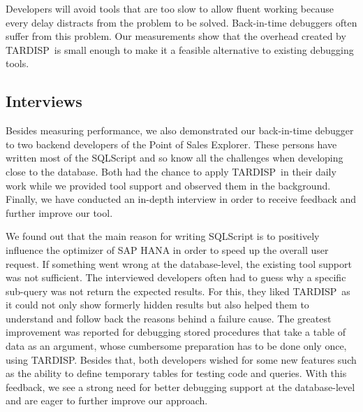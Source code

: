 \documentclass[english,conference,final]{IEEEtran}
\newcommand{\tool}{TAR\-DISP}
\begin{document}
Developers will avoid tools that are too slow to allow fluent working because every delay distracts from the problem to be solved. 
Back-in-time debuggers often suffer from this problem.
Our measurements show that the overhead created by \tool\ is small enough to make it a feasible alternative to existing debugging tools.

\subsection{Interviews}

Besides measuring performance, we also demonstrated our back-in-time debugger to two backend developers of the Point of Sales Explorer. 
These persons have written most of the SQLScript and so know all the challenges when developing close to the database. 
Both had the chance to apply \tool\ in their daily work while we provided tool support and observed them in the background. 
Finally, we have conducted an in-depth interview in order to receive feedback and further improve our tool.

We found out that the main reason for writing SQLScript is to positively influence the optimizer of SAP HANA in order to speed up the overall user request.
If something went wrong at the database-level, the existing tool support was not sufficient. 
The interviewed developers often had to guess why a specific sub-query was not return the expected results. 
For this, they liked \tool\ as it could not only show formerly hidden results but also helped them to understand and follow back the reasons behind a failure cause. 
The greatest improvement was reported for debugging stored procedures that take a table of data as an argument, whose cumbersome preparation has to be done only once, using \tool.
Besides that, both developers wished for some new features such as the ability to define temporary tables for testing code and queries.
With this feedback, we see a strong need for better debugging support at the database-level and are eager to further improve our approach.
\end{document}
